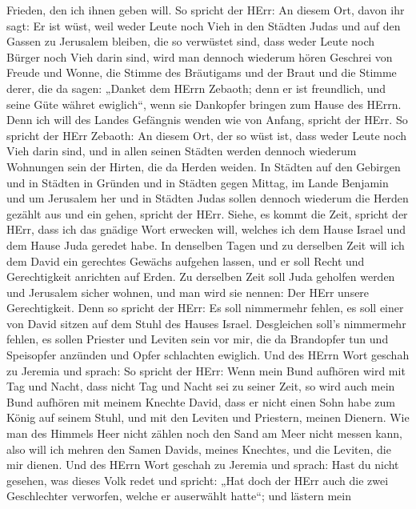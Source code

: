 Frieden, den ich ihnen geben will.  So spricht der HErr: An
diesem Ort, davon ihr sagt: Er ist wüst, weil weder Leute noch Vieh in
den Städten Judas und auf den Gassen zu Jerusalem bleiben, die so
verwüstet sind, dass weder Leute noch Bürger noch Vieh darin sind,
 wird man dennoch wiederum hören Geschrei von Freude und
Wonne, die Stimme des Bräutigams und der Braut und die Stimme derer, die
da sagen: „Danket dem HErrn Zebaoth; denn er ist freundlich, und seine
Güte währet ewiglich``, wenn sie Dankopfer bringen zum Hause des HErrn.
Denn ich will des Landes Gefängnis wenden wie von Anfang, spricht der
HErr.  So spricht der HErr Zebaoth: An diesem Ort, der so
wüst ist, dass weder Leute noch Vieh darin sind, und in allen seinen
Städten werden dennoch wiederum Wohnungen sein der Hirten, die da Herden
weiden.  In Städten auf den Gebirgen und in Städten in
Gründen und in Städten gegen Mittag, im Lande Benjamin und um Jerusalem
her und in Städten Judas sollen dennoch wiederum die Herden gezählt aus
und ein gehen, spricht der HErr.  Siehe, es kommt die Zeit,
spricht der HErr, dass ich das gnädige Wort erwecken will, welches ich
dem Hause Israel und dem Hause Juda geredet habe.  In
denselben Tagen und zu derselben Zeit will ich dem David ein gerechtes
Gewächs aufgehen lassen, und er soll Recht und Gerechtigkeit anrichten
auf Erden.  Zu derselben Zeit soll Juda geholfen werden und
Jerusalem sicher wohnen, und man wird sie nennen: Der HErr unsere
Gerechtigkeit.  Denn so spricht der HErr: Es soll
nimmermehr fehlen, es soll einer von David sitzen auf dem Stuhl des
Hauses Israel.  Desgleichen soll's nimmermehr fehlen, es
sollen Priester und Leviten sein vor mir, die da Brandopfer tun und
Speisopfer anzünden und Opfer schlachten ewiglich.  Und des
HErrn Wort geschah zu Jeremia und sprach:  So spricht der
HErr: Wenn mein Bund aufhören wird mit Tag und Nacht, dass nicht Tag und
Nacht sei zu seiner Zeit,  so wird auch mein Bund aufhören
mit meinem Knechte David, dass er nicht einen Sohn habe zum König auf
seinem Stuhl, und mit den Leviten und Priestern, meinen Dienern.
 Wie man des Himmels Heer nicht zählen noch den Sand am
Meer nicht messen kann, also will ich mehren den Samen Davids, meines
Knechtes, und die Leviten, die mir dienen.  Und des HErrn
Wort geschah zu Jeremia und sprach:  Hast du nicht gesehen,
was dieses Volk redet und spricht: „Hat doch der HErr auch die zwei
Geschlechter verworfen, welche er auserwählt hatte``; und lästern mein
